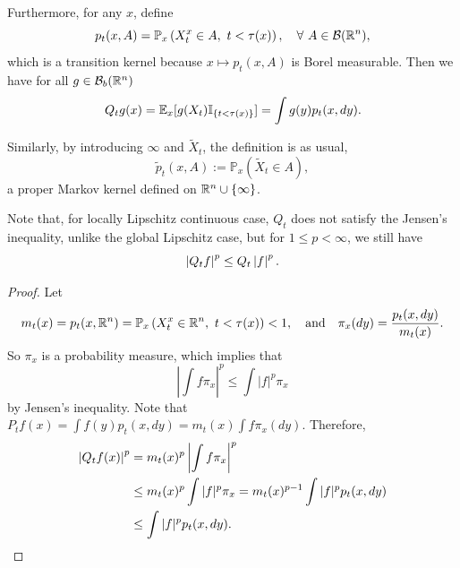 Furthermore, for any $x$, define
\begin{equation*}
    p_t(x,A) = \mathbb{P}_x\left(X^x_t \in A,~t < \tau(x)\right),\quad \forall~A \in \mathcal{B}(\mathbb{R}^n),
\end{equation*}
which is a transition kernel because $x \mapsto p_t(x,A)$ is Borel measurable. Then we have for all $g \in \mathcal{B}_b(\mathbb{R}^n)$
\begin{equation*}
    Q_tg(x) = \mathbb{E}_x[g(X_t)\mathbb{I}_{\left\{t < \tau(x)\right\}}] = \int g(y) p_t(x,dy).
\end{equation*}
\begin{rmk}
    Similarly, by introducing $\infty$ and $\tilde{X}_t$, the definition is as usual,
    \begin{equation*}
        \tilde{p}_t(x, A):=\mathbb{P}_x\left(\tilde{X}_t \in A\right),
    \end{equation*}
    a proper Markov kernel defined on $\mathbb{R}^n \cup \left\{\infty\right\}$.
\end{rmk}

Note that, for locally Lipschitz continuous case, $Q_t$ does not satisfy the Jensen's inequality, unlike the global Lipschitz case, but for $1 \leq p < \infty$, we still have
\begin{equation*}
    \left\lvert Q_t f\right\lvert^p \leq Q_t \left\lvert f\right\lvert^p.
\end{equation*}
\begin{proof}
    Let
    \begin{equation*}
        m_t(x) = p_t(x,\mathbb{R}^n) = \mathbb{P}_x\left(X^x_t \in \mathbb{R}^n,~t < \tau(x)\right) < 1,\quad \text{and}\quad \pi_x(dy) = \frac{p_t(x,dy)}{m_t(x)}.
    \end{equation*}
    So $\pi_x$ is a probability measure, which implies that
    \begin{equation*}
        \left|\int f \pi_x\right|^p \leq \int|f|^p \pi_x
    \end{equation*}
    by Jensen's inequality. Note that $P_t f(x)=\int f(y) p_t(x, d y)=m_t(x) \int f \pi_x(d y)$. Therefore,
    \begin{align*}
        \left|Q_t f(x)\right|^p &=m_t(x)^p\left|\int f \pi_x\right|^p \\
        &\leq m_t(x)^p \int|f|^p \pi_x=m_t(x)^{p-1} \int|f|^p p_t(x, d y) \\
        &\leq \int|f|^p p_t(x, d y).\qedhere
    \end{align*}
\end{proof}


